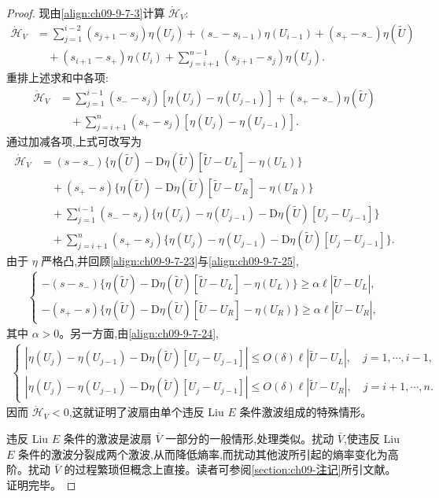 \documentclass[../../main.tex]{subfiles}
\begin{document}
\begin{proof}
现由\eqref{align:ch09-9-7-3}计算 $\dot{\mathscr{H}}_{V}$:
\begin{align}
\dot{\mathscr{H}}_{V}&=\sum_{j=1}^{i-2}(s_{j+1}-s_{j})\eta(U_{j})+(s_{-}-s_{i-1})\eta(U_{i-1})+(s_{+}-s_{-})\eta(\tilde{U})
\nonumber\\
&\quad+(s_{i+1}-s_{+})\eta(U_{i})+\sum_{j=i+1}^{n-1}(s_{j+1}-s_{j})\eta(U_{j}).
\label{align:ch09-9-7-26}
\end{align}
重排上述求和中各项:
\begin{align}
\dot{\mathscr{H}}_{V}&=\sum_{j=1}^{i-1}(s_{-}-s_{j})[\eta(U_{j})-\eta(U_{j-1})]+(s_{+}-s_{-})\eta(\tilde{U})
\nonumber\\
&\quad+\sum_{j=i+1}^{n}(s_{+}-s_{j})[\eta(U_{j})-\eta(U_{j-1})].
\label{align:ch09-9-7-27}
\end{align}
通过加减各项,上式可改写为
\begin{align}
\dot{\mathscr{H}}_{V}&=(s-s_{-})\{\eta(\tilde{U})-\mathrm{D}\eta(\tilde{U})[\tilde{U}-U_{L}]-\eta(U_{L})\}
\nonumber\\
&\quad+(s_{+}-s)\{\eta(\tilde{U})-\mathrm{D}\eta(\tilde{U})[\tilde{U}-U_{R}]-\eta(U_{R})\}
\nonumber\\
&\quad+\sum_{j=1}^{i-1}(s_{-}-s_{j})\{\eta(U_{j})-\eta(U_{j-1})-\mathrm{D}\eta(\tilde{U})[U_{j}-U_{j-1}]\}
\nonumber\\
&\quad+\sum_{j=i+1}^{n}(s_{+}-s_{j})\{\eta(U_{j})-\eta(U_{j-1})-\mathrm{D}\eta(\tilde{U})[U_{j}-U_{j-1}]\}.
\label{align:ch09-9-7-28}
\end{align}
由于 $\eta$ 严格凸,并回顾\eqref{align:ch09-9-7-23}与\eqref{align:ch09-9-7-25},
\begin{align}
\begin{cases}
-(s-s_{-})\{\eta(\tilde{U})-\mathrm{D}\eta(\tilde{U})[\tilde{U}-U_{L}]-\eta(U_{L})\}\geqslant\alpha\ell|\tilde{U}-U_{L}|,\\
-(s_{+}-s)\{\eta(\tilde{U})-\mathrm{D}\eta(\tilde{U})[\tilde{U}-U_{R}]-\eta(U_{R})\}\geqslant\alpha\ell|\tilde{U}-U_{R}|,
\end{cases}
\label{align:ch09-9-7-29}
\end{align}
其中 $\alpha>0$。另一方面,由\eqref{align:ch09-9-7-24},
\begin{align}
\begin{cases}
|\eta(U_{j})-\eta(U_{j-1})-\mathrm{D}\eta(\tilde{U})[U_{j}-U_{j-1}]|\leqslant O(\delta)\ell|\tilde{U}-U_{L}|,\quad j=1,\cdots ,i-1,\\
|\eta(U_{j})-\eta(U_{j-1})-\mathrm{D}\eta(\tilde{U})[U_{j}-U_{j-1}]|\leqslant O(\delta)\ell|\tilde{U}-U_{R}|,\quad j=i+1,\cdots ,n.
\end{cases}
\label{align:ch09-9-7-30}
\end{align}
因而 $\dot{\mathscr{H}}_{V}<0$,这就证明了波扇由单个违反 Liu $E$ 条件激波组成的特殊情形。

违反 Liu $E$ 条件的激波是波扇 $\bar{V}$ 一部分的一般情形,处理类似。扰动 $\bar{V}$,使违反 Liu $E$ 条件的激波分裂成两个激波,从而降低熵率,而扰动其他波所引起的熵率变化为高阶。扰动 $\bar{V}$ 的过程繁琐但概念上直接。读者可参阅\cref{section:ch09-注记}所引文献。证明完毕。
\end{proof}
\end{document}
